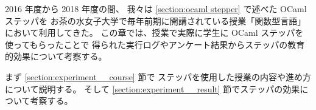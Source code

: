 
2016 年度から 2018 年度の間、
我々は \ref{section:ocaml stepper} で述べた OCaml ステッパを
お茶の水女子大学で毎年前期に開講されている授業「関数型言語」において利用してきた。
この章では、授業で実際に学生に OCaml ステッパを使ってもらったことで
得られた実行ログやアンケート結果からステッパの教育的効果について考察する。

まず \ref{section:experiment__course} 節で
ステッパを使用した授業の内容や進め方について説明する。
そして \ref{section:experiment__result} 節でステッパの効果について考察する。
